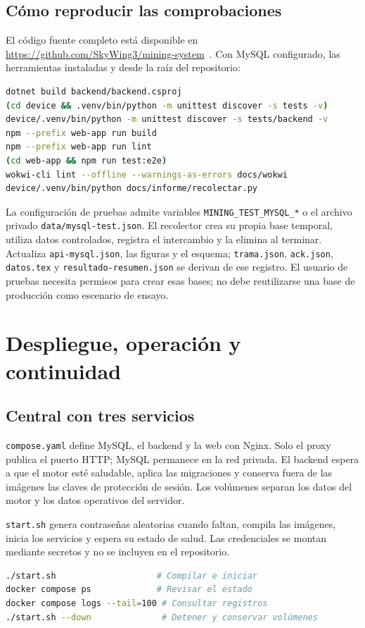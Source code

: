 \documentclass[10pt,a4paper]{article}
\newcommand{\code}[1]{{\small\urlstyle{tt}\nolinkurl{#1}}}
\newcommand{\newsection}[1]{\clearpage\section{#1}}
\begin{document}
\subsection{Cómo reproducir las comprobaciones}
El código fuente completo está disponible en \url{https://github.com/SkyWing3/mining-system}~\cite{proyecto}. Con MySQL configurado, las herramientas instaladas y desde la raíz del repositorio:
\begin{lstlisting}[language=bash]
dotnet build backend/backend.csproj
(cd device && .venv/bin/python -m unittest discover -s tests -v)
device/.venv/bin/python -m unittest discover -s tests/backend -v
npm --prefix web-app run build
npm --prefix web-app run lint
(cd web-app && npm run test:e2e)
wokwi-cli lint --offline --warnings-as-errors docs/wokwi
device/.venv/bin/python docs/informe/recolectar.py
\end{lstlisting}
La configuración de pruebas admite variables \code{MINING_TEST_MYSQL_*} o el archivo privado \code{data/mysql-test.json}. El recolector crea su propia base temporal, utiliza datos controlados, registra el intercambio y la elimina al terminar. Actualiza \code{api-mysql.json}, las figuras y el esquema; \code{trama.json}, \code{ack.json}, \code{datos.tex} y \code{resultado-resumen.json} se derivan de ese registro. El usuario de pruebas necesita permisos para crear esas bases; no debe reutilizarse una base de producción como escenario de ensayo.

\newsection{Despliegue, operación y continuidad}
\label{sec:despliegue}
\subsection{Central con tres servicios}
\code{compose.yaml} define MySQL, el backend y la web con Nginx. Solo el proxy publica el puerto HTTP; MySQL permanece en la red privada. El backend espera a que el motor esté saludable, aplica las migraciones y conserva fuera de las imágenes las claves de protección de sesión. Los volúmenes separan los datos del motor y los datos operativos del servidor.

\code{start.sh} genera contraseñas aleatorias cuando faltan, compila las imágenes, inicia los servicios y espera su estado de salud. Las credenciales se montan mediante secretos y no se incluyen en el repositorio.

\begin{lstlisting}[language=bash]
./start.sh                    # Compilar e iniciar
docker compose ps             # Revisar el estado
docker compose logs --tail=100 # Consultar registros
./start.sh --down              # Detener y conservar volúmenes
\end{lstlisting}
\end{document}
